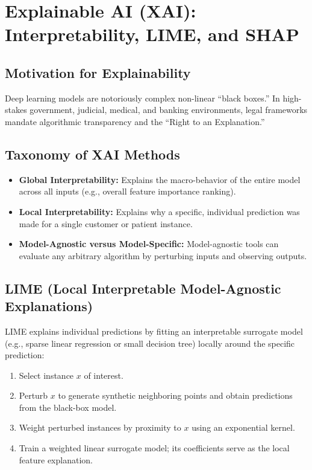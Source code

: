 \section{Explainable AI (XAI): Interpretability, LIME, and SHAP}
\label{sec:explainable_ai}

\subsection{Motivation for Explainability}
Deep learning models are notoriously complex non-linear ``black boxes.'' In high-stakes government, judicial, medical, and banking environments, legal frameworks mandate algorithmic transparency and the ``Right to an Explanation.''

\subsection{Taxonomy of XAI Methods}
\begin{itemize}
    \item \textbf{Global Interpretability:} Explains the macro-behavior of the entire model across all inputs (e.g., overall feature importance ranking).
    \item \textbf{Local Interpretability:} Explains why a specific, individual prediction was made for a single customer or patient instance.
    \item \textbf{Model-Agnostic versus Model-Specific:} Model-agnostic tools can evaluate any arbitrary algorithm by perturbing inputs and observing outputs.
\end{itemize}

\subsection{LIME (Local Interpretable Model-Agnostic Explanations)}
LIME explains individual predictions by fitting an interpretable surrogate model (e.g., sparse linear regression or small decision tree) locally around the specific prediction:
\begin{enumerate}
    \item Select instance $x$ of interest.
    \item Perturb $x$ to generate synthetic neighboring points and obtain predictions from the black-box model.
    \item Weight perturbed instances by proximity to $x$ using an exponential kernel.
    \item Train a weighted linear surrogate model; its coefficients serve as the local feature explanation.
\end{enumerate}


